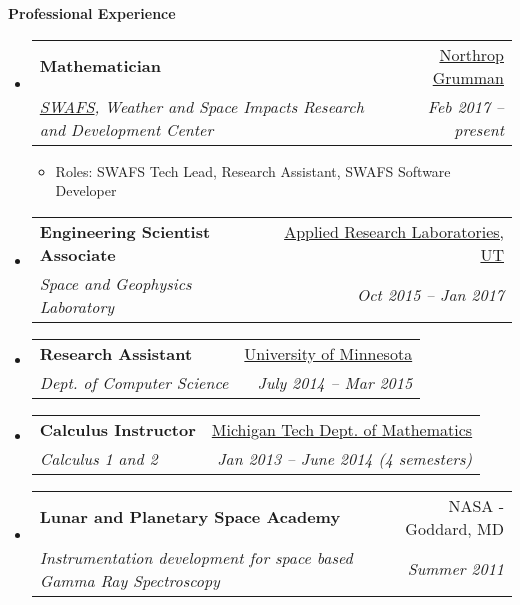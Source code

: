 \documentclass[letterpaper,11pt]{article}
\makeatletter
\newcommand{\resitem}[1]{\item #1 \vspace{-2pt}}
\newcommand{\resheading}[1]{{\large \textbf{#1}}}
\newcommand{\ressubheading}[4]{
\begin{tabular*}{6.5in}{l@{\extracolsep{\fill}}r}
		\textbf{#1} & #2 \\
		\textit{#3} & \textit{#4} \\
\end{tabular*}\vspace{-6pt}}
\makeatother
\begin{document}
\resheading{Professional Experience}
\begin{itemize}
\item%
  \ressubheading{Mathematician}{\href{https://www.northropgrumman.com}{Northrop Grumman}}{
      \href{http://www.northropgrumman.com/Capabilities/SpaceWeatherAnalysis/Pages/default.aspx}{SWAFS},
        Weather and Space Impacts Research and Development Center}{Feb 2017 -- present}
  {\footnotesize
  \begin{itemize}  
    \resitem{Roles: SWAFS Tech Lead, Research Assistant, SWAFS Software Developer}
  \end{itemize}
  }
\item%
  \ressubheading{Engineering Scientist Associate}{\href{https://www.arlut.utexas.edu}{Applied Research Laboratories, UT}}{Space and Geophysics Laboratory}{Oct 2015 -- Jan 2017}
  {\footnotesize
  }
\item
  \ressubheading{Research Assistant}{\href{https://www.cs.umn.edu}{University of Minnesota}}{Dept. of Computer Science}{July 2014 -- Mar 2015}
\item%
  \ressubheading{Calculus Instructor}{\href{www.mtu.edu/math/}{Michigan Tech Dept. of Mathematics}}{Calculus 1 and 2}{Jan 2013 -- June 2014 (4 semesters)}
\item%
	\ressubheading{Lunar and Planetary Space Academy}{NASA - Goddard, MD}{Instrumentation development for space based Gamma Ray Spectroscopy}{Summer 2011}


\end{itemize}
\end{document}
